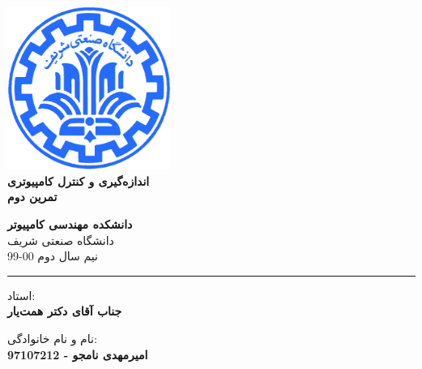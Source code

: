 \documentclass[12pt]{article}
\begin{document}
\begin{titlepage}
\begin{center}
        
\vspace*{0.7cm}

\includegraphics[width=0.4\textwidth]{sharif1.png}\\
\vspace{0.5cm}
\textbf{ \Huge{\emph ‌اندازه‌گیری و کنترل کامپیوتری} }\\
\vspace{0.5cm}
\textbf{ \Large{ تمرین دوم} }
\vspace{0.2cm}
       
 
      \large \textbf{دانشکده مهندسی کامپیوتر}\\\vspace{0.2cm}
    \large   دانشگاه صنعتی شریف\\\vspace{0.2cm}
       \large   ﻧﯿﻢ سال دوم 00-99 \\\vspace{0.2cm}
      \noindent\rule[1ex]{\linewidth}{1pt}
استاد:\\
    \textbf{{جناب آقای دکتر همت‌یار}}


    \vspace{0.15cm}
نام و نام خانوادگی:\\

       
    \textbf{{امیرمهدی نامجو - 97107212}}
\end{center}
\end{titlepage}


\newpage
\pagestyle{fancy}
\fancyhf{}
\fancyfoot{}
\cfoot{\thepage}
\end{document}

